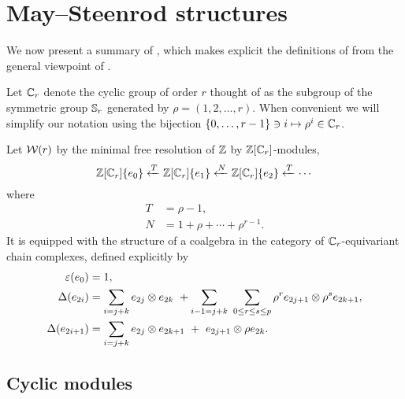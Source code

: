 
\section{May--Steenrod structures}

We now present a summary of \cite{medina2021may_st}, which makes explicit the definitions of \cite{steenrod1953cyclic} from the general viewpoint of \cite{may1970general}.

Let $\mathbb{C}_r$ denote the cyclic group of order $r$ thought of as the subgroup of the symmetric group $\mathbb{S}_r$ generated by $\rho = (1,2,\dots,r)$.
When convenient we will simplify our notation using the bijection $\{0,\dots,r-1\} \ni i \mapsto \rho^i \in \mathbb{C}_r$.

Let $\mathcal{W}(r)$ by the minimal free resolution of $\mathbb{Z}$ by $\mathbb{Z}[\mathbb{C}_r]$-modules,
\begin{equation}\label{eq: minimal resolution}
	\mathbb{Z}[\mathbb{C}_r]\{e_0\} \xleftarrow{T} \mathbb{Z}[\mathbb{C}_r]\{e_1\} \xleftarrow{N} \mathbb{Z}[\mathbb{C}_r]\{e_2\} \xleftarrow{T} \cdots
\end{equation}
where
\begin{equation} \label{eq: T and R definition}
	\begin{split}
		T &= \rho - 1, \\
		N &= 1 + \rho + \cdots + \rho^{r-1}.
	\end{split}
\end{equation}
It is equipped with the structure of a coalgebra in the category of $\mathbb{C}_r$-equivariant chain complexes, defined explicitly by
\begin{align*}
	\varepsilon(e_0) &= 1, \\
	\Delta(e_{2i}) &=
	\sum_{i=j+k} e_{2j} \otimes e_{2k} \ + \sum_{i-1=j+k} \ \sum_{0 \leq r \leq s \leq p} \rho^r e_{2j+1} \otimes \rho^s e_{2k+1}, \\
	\Delta(e_{2i+1}) &=
	\sum_{i=j+k} e_{2j} \otimes e_{2k+1} \ +\ e_{2j+1} \otimes \rho e_{2k}.
\end{align*}


\subsection{Cyclic modules}

